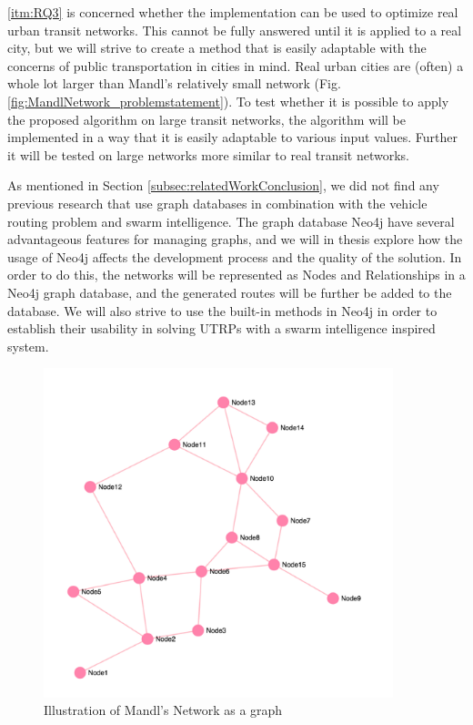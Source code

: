 \vref{itm:RQ3} is concerned whether the implementation can be used to optimize real urban transit networks. This cannot be fully answered until it is applied to a real city, but we will strive to create a method that is easily adaptable with the concerns of public transportation in cities in mind. Real urban cities are (often) a whole lot larger than Mandl's relatively small network (Fig. \vref{fig:MandlNetwork_problemstatement}). To  test whether it is possible to apply the proposed algorithm on large transit networks, the algorithm will be implemented in a way that it is easily adaptable to various input values. Further it will be tested on large networks more similar to real transit networks. 

As mentioned in Section \vref{subsec:relatedWorkConclusion}, we did not find any previous research that use graph databases in combination with the vehicle routing problem and swarm intelligence. The graph database Neo4j \citep{website:neo4j} have several advantageous features for managing graphs, and we will in thesis explore how the usage of Neo4j affects the development process and the quality of the solution.  In order to do this, the networks will be represented as Nodes and Relationships in a Neo4j graph database, and the generated routes will be further be added to the database. We will also strive to use the built-in methods in Neo4j in order to establish their usability in solving UTRPs with a swarm intelligence inspired system. 



\begin{figure}[H]
\begin{center}
  \includegraphics[width=4in]{assets/mandlnetwork_crop.png}
  \end{center}
  \caption{Illustration of Mandl's Network as a graph}
  \label{fig:MandlNetwork_problemstatement} 
\end{figure}







